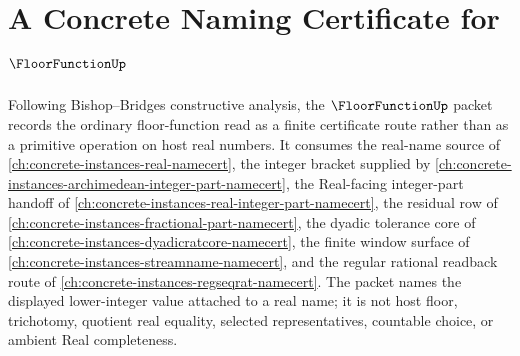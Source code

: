 \chapter{A Concrete Naming Certificate for $\FloorFunctionUp$}
\label{ch:concrete-instances-floor-function-namecert}

Following Bishop--Bridges constructive analysis, the $\FloorFunctionUp$ packet records the ordinary floor-function read as a finite certificate route rather than as a primitive operation on host real numbers. It consumes the real-name source of \autoref{ch:concrete-instances-real-namecert}, the integer bracket supplied by \autoref{ch:concrete-instances-archimedean-integer-part-namecert}, the Real-facing integer-part handoff of \autoref{ch:concrete-instances-real-integer-part-namecert}, the residual row of \autoref{ch:concrete-instances-fractional-part-namecert}, the dyadic tolerance core of \autoref{ch:concrete-instances-dyadicratcore-namecert}, the finite window surface of \autoref{ch:concrete-instances-streamname-namecert}, and the regular rational readback route of \autoref{ch:concrete-instances-regseqrat-namecert}. The packet names the displayed lower-integer value attached to a real name; it is not host floor, trichotomy, quotient real equality, selected representatives, countable choice, or ambient Real completeness.

